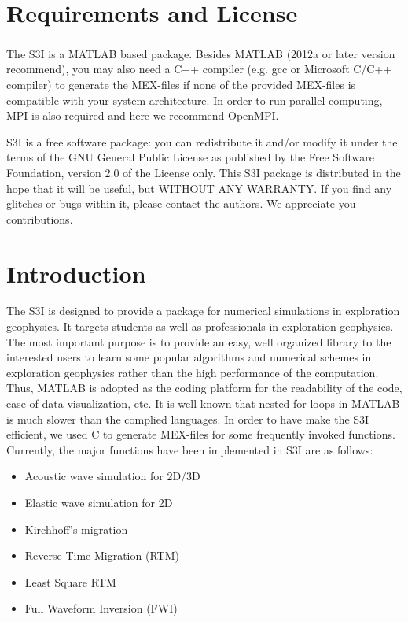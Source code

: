 \documentclass[11pt,titlepage]{article}
\theoremstyle{plain}
\theoremstyle{definition}
\theoremstyle{remark}
\numberwithin{equation}{section}
\begin{document}

\tableofcontents
\newpage



\section{Requirements and License}
The S3I is a MATLAB\textsuperscript{\textregistered} based package. Besides MATLAB (2012a or later version recommend), you may also need a C++ compiler (e.g. gcc or Microsoft C/C++ compiler) to generate the MEX-files if none of the provided MEX-files is compatible with your system architecture. In order to run parallel computing, MPI is also required and here we recommend OpenMPI.

S3I is a free software package: you can redistribute it and/or modify it under the terms of the GNU General Public License as published by the Free Software Foundation, version 2.0 of the License only. This S3I package is distributed in the hope that it will be useful, but WITHOUT ANY WARRANTY. If you find any glitches or bugs within it, please contact the authors. We appreciate you contributions. 



\section{Introduction}
The S3I is designed to provide a package for numerical simulations in exploration geophysics. It targets students as well as professionals in exploration geophysics. The most important purpose is to provide an easy, well organized library to the interested users to learn some popular algorithms and numerical schemes in exploration geophysics rather than the high performance of the computation. Thus, MATLAB is adopted as the coding platform for the readability of the code, ease of data visualization, etc. It is well known that nested for-loops in MATLAB is much slower than the complied languages. In order to have make the S3I efficient, we used C to generate MEX-files for some frequently invoked functions. Currently, the major functions have been implemented in S3I are as follows:
\begin{itemize}
\item Acoustic wave simulation for 2D/3D
\item Elastic wave simulation for 2D
\item Kirchhoff's migration
\item Reverse Time Migration (RTM)
\item Least Square RTM
\item Full Waveform Inversion (FWI)
\end{itemize}
\end{document}
